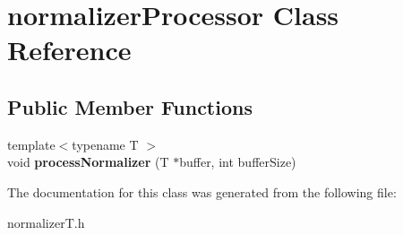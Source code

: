 \hypertarget{classnormalizerProcessor}{}\section{normalizer\+Processor Class Reference}
\label{classnormalizerProcessor}
\subsection*{Public Member Functions}
\begin{DoxyCompactItemize}
\item 
\mbox{\label{classnormalizerProcessor_aea725ba0a175e3fd1e964f5381269a38}} 
{\footnotesize template$<$typename T $>$ }\\void {\bfseries process\+Normalizer} (T $\ast$buffer, int buffer\+Size)
\end{DoxyCompactItemize}


The documentation for this class was generated from the following file\+:\begin{DoxyCompactItemize}
\item 
normalizer\+T.\+h\end{DoxyCompactItemize}
